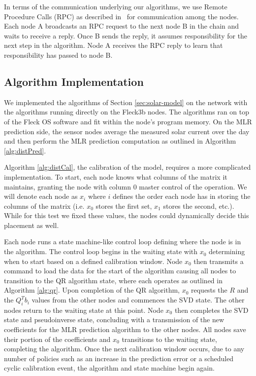 \documentclass[prodmode,acmtosn]{acmsmall}
\begin{document}
In terms of the communication underlying our algorithms, we use Remote Procedure Calls (RPC) as described in~\cite{Corke_pieee10} for communication among the nodes.
Each node A broadcasts an RPC request to the next node B in the chain and waits to receive a reply.
Once B sends the reply, it assumes responsibility for the next step in the algorithm.
Node A receives the RPC reply to learn that responsibility has passed to node B.\newline

\subsection{Algorithm Implementation}
We implemented the algorithms of Section \ref{sec:solar-model} on the network with the algorithms running directly on the Fleck\texttrademark3b nodes.
The algorithms ran on top of the Fleck OS software and fit within the node's program memory.
On the MLR prediction side, the sensor nodes average the measured solar current over the day and then perform the MLR prediction computation as outlined in Algorithm \ref{alg:distPred}.

Algorithm \ref{alg:distCal}, the calibration of the model, requires a more complicated implementation.
To start, each node knows what columns of the matrix it maintains, granting the node with column $0$ master control of the operation.
We will denote each node as $x_i$ where $i$ defines the order each node has in storing the columns of the matrix (i.e. $x_0$ stores the first set, $x_1$ stores the second, etc.).
While for this test we fixed these values, the nodes could dynamically decide this placement as well.

Each node runs a state machine-like control loop defining where the node is in the algorithm.
The control loop begins in the waiting state with $x_0$ determining when to start based on a defined calibration window.
Node $x_0$ then transmits a command to load the data for the start of the algorithm causing all nodes to transition to the QR algorithm state, where each operates as outlined in Algorithm \ref{alg:qr}.
Upon completion of the QR algorithm, $x_0$ requests the $R$ and the $Q_i^Tb_i$ values from the other nodes and commences the SVD state.
The other nodes return to the waiting state at this point.
Node $x_0$ then completes the SVD state and pseudoinverse state, concluding with a transmission of the new coefficients for the MLR prediction algorithm to the other nodes.
All nodes save their portion of the coefficients and $x_0$ transitions to the waiting state, completing the algorithm.
Once the next calibration window occurs, due to any number of policies such as an increase in the prediction error or a scheduled cyclic calibration event, the algorithm and state machine begin again.
\end{document}
